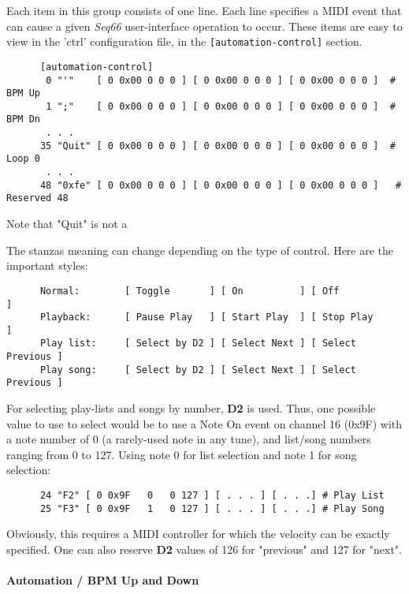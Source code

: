    Each item in this group consists of one line.  Each line
   specifies a MIDI event that can cause a given
   \textsl{Seq66} user-interface operation to occur.
   These items are easy to view in the 'ctrl' configuration file,
   in the \texttt{[automation-control]} section.

   \begin{verbatim}
      [automation-control]
       0 "'"    [ 0 0x00 0 0 0 ] [ 0 0x00 0 0 0 ] [ 0 0x00 0 0 0 ]  # BPM Up
       1 ";"    [ 0 0x00 0 0 0 ] [ 0 0x00 0 0 0 ] [ 0 0x00 0 0 0 ]  # BPM Dn
       . . .
      35 "Quit" [ 0 0x00 0 0 0 ] [ 0 0x00 0 0 0 ] [ 0 0x00 0 0 0 ]  # Loop 0
       . . .
      48 "0xfe" [ 0 0x00 0 0 0 ] [ 0 0x00 0 0 0 ] [ 0 0x00 0 0 0 ]   # Reserved 48
   \end{verbatim}

   Note that "Quit" is not a 

   The stanzas meaning can change depending on the type of control.  Here are
   the important styles:

   \begin{verbatim}
      Normal:        [ Toggle       ] [ On          ] [ Off             ]
      Playback:      [ Pause Play   ] [ Start Play  ] [ Stop Play       ]
      Play list:     [ Select by D2 ] [ Select Next ] [ Select Previous ]
      Play song:     [ Select by D2 ] [ Select Next ] [ Select Previous ]
   \end{verbatim}

   For selecting play-lists and songs by number, \textbf{D2} is used.
   Thus, one possible value to use to select would be to use a 
   Note On event on channel 16 (0x9F) with a note number of 0 (a rarely-used
   note in any tune), and list/song numbers ranging from 0 to 127.  Using note
   0 for list selection and note 1 for song selection:

   \begin{verbatim}
      24 "F2" [ 0 0x9F   0   0 127 ] [ . . . ] [ . . .] # Play List
      25 "F3" [ 0 0x9F   1   0 127 ] [ . . . ] [ . . .] # Play Song
   \end{verbatim}

   Obviously, this requires a MIDI controller for which the velocity can be
   exactly specified.  One can also reserve \textbf{D2} values of 126 for
   "previous" and 127 for "next".

\paragraph{Automation / BPM Up and Down}
\label{paragraph:configuration_midi_ctrl_bpmupdn}

